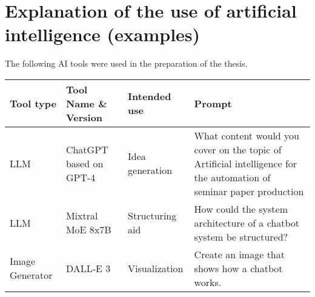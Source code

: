 
\section*{Explanation of the use of artificial intelligence (examples)}

\thispagestyle{empty}
\bigskip
The following AI tools were used in the preparation of the thesis.
\begin{table}[ht]
    \centering
    {\small
    \emergencystretch=100mm
        \begin{tabular}{p{3cm}p{3cm}p{3cm}p{5cm}}
            \hline
            Tool type & Tool Name \& Version & Intended use & Prompt \\
            \hline
            LLM &
            ChatGPT based on GPT-4 &
            Idea generation &
            What
            content would you cover on the topic of Artificial intelligence for the
            automation of seminar paper production
            \\
            \hline
            LLM &
            Mixtral MoE 8x7B &
            Structuring aid &

            How
            could the system architecture of a chatbot system be structured?
            \\
            \hline
            Image Generator &
            DALL-E 3 &
            Visualization &
            Create an image that shows how a chatbot works.\\
            \hline
        \end{tabular}
    }
\end{table}


